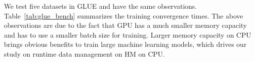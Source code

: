 \textcolor{check}{
We test five datasets in GLUE and have the same observations. Table~\ref{tab:glue_bench} summarizes the training convergence times. The above observations are due to the fact that GPU has a much smaller memory capacity and has to use a smaller batch size for training. Larger memory capacity on CPU brings obvious benefits to train large machine learning models, which drives our study on runtime data management on HM on CPU.
}

